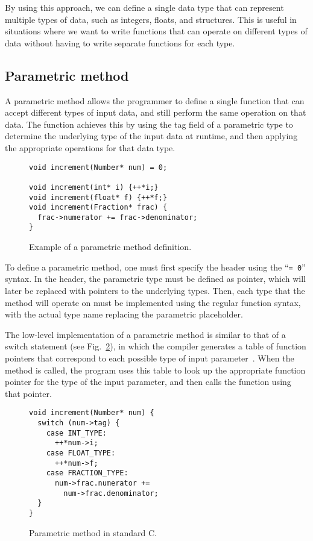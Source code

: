 \documentclass[conference]{IEEEtran}
\begin{document}
By using this approach, we can define a single data type that can represent multiple types of data, such as integers, floats, and structures.
This is useful in situations where we want to write functions that can operate on different types of data without having to write separate functions for each type.

\subsection{Parametric method} %
A parametric method allows the programmer to define a single function that can accept different types of input data, and still perform the same operation on that data.
The function achieves this by using the tag field of a parametric type to determine the underlying type of the input data at runtime, and then applying the appropriate operations for that data type.

\begin{figure}[htbp]
  \begin{lstlisting}[frame=single,basicstyle=\ttfamily]
void increment(Number* num) = 0;

void increment(int* i) {++*i;}
void increment(float* f) {++*f;}
void increment(Fraction* frac) {
  frac->numerator += frac->denominator;
}
  \end{lstlisting}
  \caption{Example of a parametric method definition.}
  \label{fig:funcdef}
\end{figure}

To define a parametric method, one must first specify the header using the ``\texttt{= 0}'' syntax.
In the header, the parametric type must be defined as pointer, which will later be replaced with pointers to the underlying types.
Then, each type that the method will operate on must be implemented using the regular function syntax, with the actual type name replacing the parametric placeholder.

The low-level implementation of a parametric method is similar to that of a switch statement (see Fig.~\ref{fig:funcdefpurec}), in which the compiler generates a table of function pointers that correspond to each possible type of input parameter~\cite{legalov2016evolutionary}.
When the method is called, the program uses this table to look up the appropriate function pointer for the type of the input parameter, and then calls the function using that pointer.

\begin{figure}[htbp]
  \begin{lstlisting}[frame=single,basicstyle=\ttfamily]
void increment(Number* num) {
  switch (num->tag) {
    case INT_TYPE:
      ++*num->i;
    case FLOAT_TYPE:
      ++*num->f;
    case FRACTION_TYPE:
      num->frac.numerator +=
        num->frac.denominator;
  }
}
  \end{lstlisting}
  \caption{Parametric method in standard C.}
  \label{fig:funcdefpurec}
\end{figure}
\end{document}
